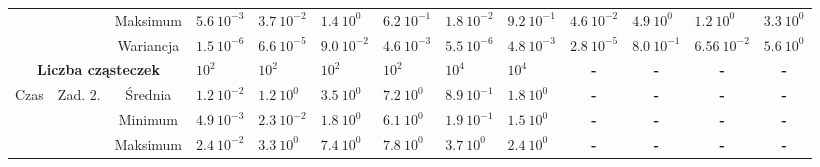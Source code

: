\documentclass[11pt, a4paper, oneside]{article}
\begin{document}
\begin{table}[t]
\begin{adjustwidth}{-1.76cm}{}
\begin{tabular}{|c|c|c|l|l|l|l|l|l|c|c|c|c|}
                      &                            & Maksimum  & $5.6 \ 10^{-3}$          & $3.7 \ 10^{-2}$         & $1.4 \ 10^{0}$           & $6.2 \ 10^{-1}$         & $1.8 \ 10^{-2}$          & $9.2 \ 10^{-1}$         & \multicolumn{1}{l|}{$4.6 \ 10^{-2}$}   & \multicolumn{1}{l|}{$4.9 \ 10^{0}$}    & \multicolumn{1}{l|}{$1.2 \ 10^{0}$}    & \multicolumn{1}{l|}{$3.3 \ 10^{0}$}    \\ \cline{3-13} 
                      &                            & Wariancja & $1.5 \ 10^{-6}$          & $6.6 \ 10^{-5}$         & $9.0 \ 10^{-2}$          & $4.6 \ 10^{-3}$         & $5.5 \ 10^{-6}$          & $4.8 \ 10^{-3}$         & \multicolumn{1}{l|}{$2.8 \ 10^{-5}$}   & \multicolumn{1}{l|}{$8.0 \ 10^{-1}$}   & \multicolumn{1}{l|}{$6.56 \ 10^{-2}$}  & \multicolumn{1}{l|}{$5.6 \ 10^{0}$}    \\ \hline
\multicolumn{3}{|c|}{\textbf{Liczba cząsteczek}}               & \textbf{$10^{2}$}        & \textbf{$10^{2}$}       & \textbf{$10^{2}$}        & \textbf{$10^{2}$}       & \textbf{$10^{4}$}        & \textbf{$10^{4}$}       & \textbf{-}                             & \textbf{-}                             & \textbf{-}                             & \textbf{-}                             \\ \hline
\multirow{4}{*}{Czas} & Zad. $2$.                  & Średnia   & $1.2 \ 10^{-2}$          & $1.2 \ 10^{0}$          & $3.5 \ 10^{0}$           & $7.2 \ 10^{0}$          & $8.9 \ 10^{-1}$          & $1.8 \ 10^{0}$          & \textbf{-}                             & \textbf{-}                             & \textbf{-}                             & \textbf{-}                             \\ \cline{3-13} 
                      &                            & Minimum   & $4.9 \ 10^{-3}$          & $2.3 \ 10^{-2}$         & $1.8 \ 10^{0}$           & $6.1 \ 10^{0}$          & $1.9 \ 10^{-1}$          & $1.5 \ 10^{0}$          & \textbf{-}                             & \textbf{-}                             & \textbf{-}                             & \textbf{-}                             \\ \cline{3-13} 
                      &                            & Maksimum  & $2.4 \ 10^{-2}$          & $3.3 \ 10^{0}$          & $7.4 \ 10^{0}$           & $7.8 \ 10^{0}$          & $3.7 \ 10^{0}$           & $2.4 \ 10^{0}$          & \textbf{-}                             & \textbf{-}                             & \textbf{-}                             & \textbf{-}                             \\ \cline{3-13} 

\end{tabular}
\end{adjustwidth}
\end{table}
\end{document}
